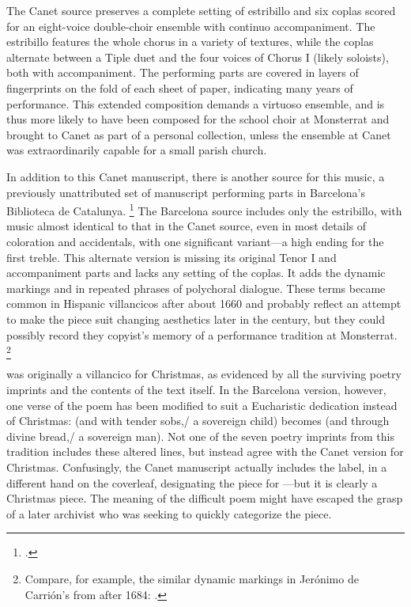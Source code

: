 The Canet source preserves a complete setting of estribillo and six coplas
scored for an eight-voice double-choir ensemble with continuo accompaniment.
The estribillo features the whole chorus in a variety of textures, while the
coplas alternate between a Tiple duet and the four voices of Chorus I (likely
soloists), both with accompaniment.
The performing parts are covered in layers of fingerprints on the fold of each
sheet of paper, indicating many years of performance.
This extended composition demands a virtuoso ensemble, and is thus more likely
to have been composed for the school choir at Monsterrat and brought to Canet as
part of a personal collection, unless the ensemble at Canet was extraordinarily
capable for a small parish church.

In addition to this Canet manuscript, there is another source for this music, a
previously unattributed set of manuscript performing parts in Barcelona's
Biblioteca de Catalunya.%
    \footnote{.}
The Barcelona source includes only the estribillo, with music almost identical
to that in the Canet source, even in most details of coloration and accidentals,
with one significant variant---a  high ending for the first treble.
This alternate version is missing its original Tenor I and accompaniment parts
and lacks any setting of the coplas.
It adds the dynamic markings  and  in repeated phrases
of polychoral dialogue. 
These terms became common in Hispanic villancicos after about 1660 and probably
reflect an attempt to make the piece suit changing aesthetics later in the
century, but they could possibly record they copyist's memory of a performance
tradition at Monsterrat.%
    \footnote{Compare, for example, the similar dynamic markings in Jerónimo de
    Carrión's  from after 1684: 
    \autocite[331--336]{Cashner:PhD}.}

 was originally a villancico for Christmas, as
evidenced by all the surviving poetry imprints and the contents of the text
itself.
In the Barcelona version, however, one verse of the poem has been modified to
suit a Eucharistic dedication instead of Christmas:  (and with tender sobs,/ a sovereign child) becomes
 (and through divine bread,/
a sovereign man).
Not one of the seven poetry imprints from this tradition includes these altered
lines, but instead agree with the Canet version for Christmas.
Confusingly, the Canet manuscript actually includes the label, in a different
hand on the coverleaf, designating the piece for ---but it is clearly a Christmas piece.
The meaning of the difficult poem might have escaped the grasp of a later
archivist who was seeking to quickly categorize the piece.

